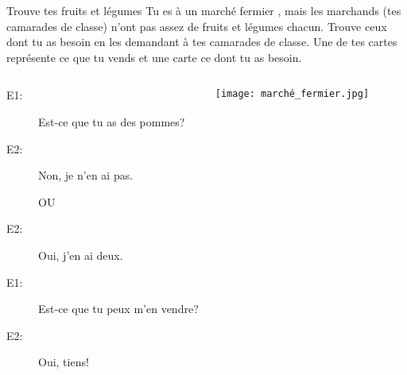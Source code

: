 \begin{frame}{Trouve tes fruits et légumes}
  Tu es à un marché fermier , mais les marchands (tes camarades de classe) n'ont pas assez de fruits et légumes chacun.
  Trouve ceux dont tu as besoin en les demandant à tes camarades de classe.
  Une de tes cartes représente ce que tu vends et une carte ce dont tu as besoin. \\
  \begin{columns}
      \small
      \begin{description}
        \item[E1:] Est-ce que tu as des pommes?
        \item[E2:] Non, je n'\alert{en} ai pas.
        \item[] OU
        \item[E2:] Oui, j'\alert{en} ai \alert{deux}.
        \item[E1:] Est-ce que tu peux m'\alert{en} vendre?
        \item[E2:] Oui, tiens!
      \end{description}
      \begin{center}
        \texttt{[image: marché\_fermier.jpg]}
      \end{center}
  \end{columns}
\end{frame}